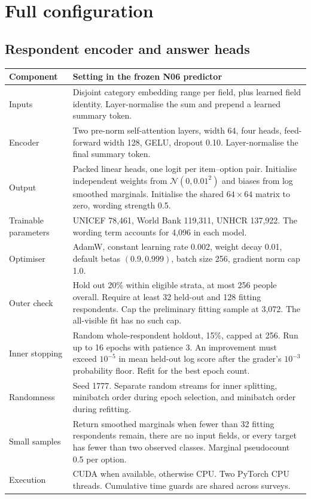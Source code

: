 \documentclass{article}
\begin{document}
\clearpage
\appendix
\section{Full configuration}\label{app:config}
\subsection{Respondent encoder and answer heads}
\begin{center}\small
\begin{tabularx}{\linewidth}{@{}lY@{}}
\toprule Component & Setting in the frozen N06 predictor\\\midrule
Inputs & Disjoint category embedding range per field, plus learned field identity. Layer-normalise the sum and prepend a learned summary token.\\
Encoder & Two pre-norm self-attention layers, width 64, four heads, feed-forward width 128, GELU, dropout 0.10. Layer-normalise the final summary token.\\
Output & Packed linear heads, one logit per item--option pair. Initialise independent weights from $\mathcal N(0,0.01^2)$ and biases from log smoothed marginals. Initialise the shared $64\times64$ matrix to zero, wording strength 0.5.\\
Trainable parameters & UNICEF 78,461, World Bank 119,311, UNHCR 137,922. The wording term accounts for 4,096 in each model.\\
Optimiser & AdamW, constant learning rate 0.002, weight decay 0.01, default betas $(0.9,0.999)$, batch size 256, gradient norm cap 1.0.\\
Outer check & Hold out 20\% within eligible strata, at most 256 people overall. Require at least 32 held-out and 128 fitting respondents. Cap the preliminary fitting sample at 3,072. The all-visible fit has no such cap.\\
Inner stopping & Random whole-respondent holdout, 15\%, capped at 256. Run up to 16 epochs with patience 3. An improvement must exceed $10^{-5}$ in mean held-out log score after the grader's $10^{-3}$ probability floor. Refit for the best epoch count.\\
Randomness & Seed 1777. Separate random streams for inner splitting, minibatch order during epoch selection, and minibatch order during refitting.\\
Small samples & Return smoothed marginals when fewer than 32 fitting respondents remain, there are no input fields, or every target has fewer than two observed classes. Marginal pseudocount 0.5 per option.\\
Execution & CUDA when available, otherwise CPU. Two PyTorch CPU threads. Cumulative time guards are shared across surveys.\\
\bottomrule\end{tabularx}\end{center}
\end{document}

